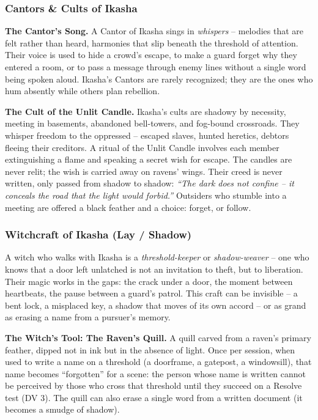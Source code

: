 \subsubsection*{Cantors \& Cults of Ikasha}

\textbf{The Cantor's Song.} A Cantor of Ikasha sings in \textit{whispers} -- melodies that are felt rather than heard, harmonies that slip beneath the threshold of attention. Their voice is used to hide a crowd's escape, to make a guard forget why they entered a room, or to pass a message through enemy lines without a single word being spoken aloud. Ikasha's Cantors are rarely recognized; they are the ones who hum absently while others plan rebellion.

\textbf{The Cult of the Unlit Candle.} Ikasha's cults are shadowy by necessity, meeting in basements, abandoned bell-towers, and fog-bound crossroads. They whisper freedom to the oppressed -- escaped slaves, hunted heretics, debtors fleeing their creditors. A ritual of the Unlit Candle involves each member extinguishing a flame and speaking a secret wish for escape. The candles are never relit; the wish is carried away on ravens' wings. Their creed is never written, only passed from shadow to shadow: \textit{``The dark does not confine -- it conceals the road that the light would forbid.''} Outsiders who stumble into a meeting are offered a black feather and a choice: forget, or follow.

\subsubsection*{Witchcraft of Ikasha (Lay / Shadow)}

A witch who walks with Ikasha is a \textit{threshold-keeper} or \textit{shadow-weaver} -- one who knows that a door left unlatched is not an invitation to theft, but to liberation. Their magic works in the gaps: the crack under a door, the moment between heartbeats, the pause between a guard's patrol. This craft can be invisible -- a bent lock, a misplaced key, a shadow that moves of its own accord -- or as grand as erasing a name from a pursuer's memory.

\textbf{The Witch's Tool: The Raven's Quill.} A quill carved from a raven's primary feather, dipped not in ink but in the absence of light. Once per session, when used to write a name on a threshold (a doorframe, a gatepost, a windowsill), that name becomes ``forgotten'' for a scene: the person whose name is written cannot be perceived by those who cross that threshold until they succeed on a Resolve test (DV 3). The quill can also erase a single word from a written document (it becomes a smudge of shadow).

